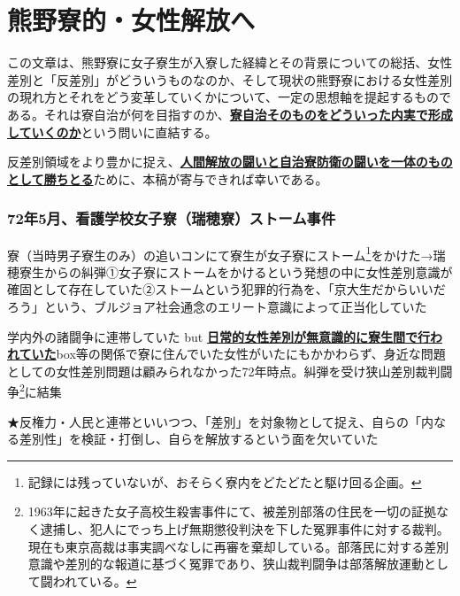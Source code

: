 \section{熊野寮的・女性解放へ}

\vspace{5mm}


この文章は、熊野寮に女子寮生が入寮した経緯とその背景についての総括、女性差別と「反差別」がどういうものなのか、そして現状の熊野寮における女性差別の現れ方とそれをどう変革していくかについて、一定の思想軸を提起するものである。それは寮自治が何を目指すのか、\uline{\bf{寮自治そのものをどういった内実で形成していくのか}}という問いに直結する。\par 反差別領域をより豊かに捉え、\uline{\bf{人間解放の闘いと自治寮防衛の闘いを一体のものとして勝ちとる}}ために、本稿が寄与できれば幸いである。


\vspace{10mm}

\subsubsection{\large 72年5月、看護学校女子寮（瑞穂寮）ストーム事件}
寮（当時男子寮生のみ）の追いコンにて寮生が女子寮にストーム\footnote{記録には残っていないが、おそらく寮内をどたどたと駆け回る企画。}をかけた\newline →瑞穂寮生からの糾弾\newline ①女子寮にストームをかけるという発想の中に女性差別意識が確固として存在していた\newline ②ストームという犯罪的行為を、「京大生だからいいだろう」という、ブルジョア社会通念のエリート意識によって正当化していた

\vspace{1mm}
\noindent 学内外の諸闘争に連帯していた but \uline{\bf{日常的女性差別が無意識的に寮生間で行われていた}}\newline box等の関係で寮に住んでいた女性がいたにもかかわらず、身近な問題としての女性差別問題は顧みられなかった\newline 72年時点。糾弾を受け狭山差別裁判闘争\footnote{1963年に起きた女子高校生殺害事件にて、被差別部落の住民を一切の証拠なく逮捕し、犯人にでっち上げ無期懲役判決を下した冤罪事件に対する裁判。現在も東京高裁は事実調べなしに再審を棄却している。部落民に対する差別意識や差別的な報道に基づく冤罪であり、狭山裁判闘争は部落解放運動として闘われている。}に結集

\vspace{1mm}
\noindent ★反権力・人民と連帯といいつつ、「差別」を対象物として捉え、自らの「内なる差別性」を検証・打倒し、自らを解放するという面を欠いていた

